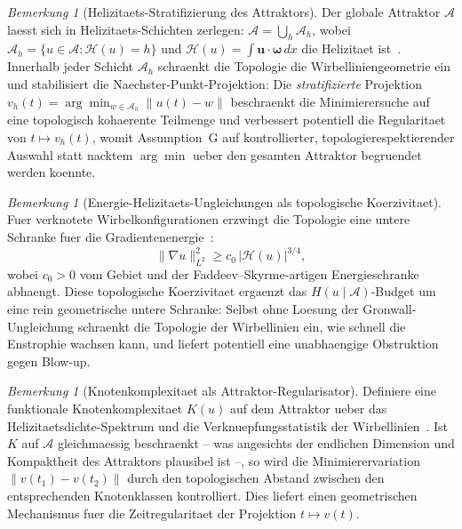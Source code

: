 \documentclass[12pt,a4paper]{article}
\theoremstyle{definition}
\theoremstyle{plain}
\theoremstyle{remark}
\newtheorem{remark}[definition]{Bemerkung}
\begin{document}
\begin{remark}[Helizitaets-Stratifizierung des Attraktors]
\label{rem:helicity-stratification}
Der globale Attraktor $\mathcal{A}$ laesst sich in
Helizitaets-Schichten zerlegen:
$\mathcal{A} = \bigcup_h \mathcal{A}_h$, wobei
$\mathcal{A}_h = \{ u \in \mathcal{A} : \mathcal{H}(u) = h \}$ und
$\mathcal{H}(u) = \int \mathbf{u} \cdot \boldsymbol{\omega}\, dx$
die Helizitaet ist~\cite{Moffatt69, ArnoldKhesin98}. Innerhalb jeder
Schicht $\mathcal{A}_h$ schraenkt die Topologie die
Wirbelliniengeometrie ein und stabilisiert die
Naechster-Punkt-Projektion: Die \emph{stratifizierte} Projektion
$v_h(t) = \arg\min_{w \in \mathcal{A}_h} \|u(t) - w\|$ beschraenkt
die Minimierersuche auf eine topologisch kohaerente Teilmenge und
verbessert potentiell die Regularitaet von $t \mapsto v_h(t)$, womit
Assumption~G auf kontrollierter, topologierespektierender Auswahl
statt nacktem $\arg\min$ ueber den gesamten Attraktor begruendet
werden koennte.
\end{remark}

\begin{remark}[Energie-Helizitaets-Ungleichungen als topologische
Koerzivitaet]
\label{rem:helicity-energy-bounds}
Fuer verknotete Wirbelkonfigurationen erzwingt die Topologie eine
untere Schranke fuer die Gradientenenergie~\cite{ArnoldKhesin98}:
\[
  \|\nabla u\|_{L^2}^2 \geq c_0 \, |\mathcal{H}(u)|^{3/4},
\]
wobei $c_0 > 0$ vom Gebiet und der Faddeev--Skyrme-artigen
Energieschranke abhaengt. Diese topologische Koerzivitaet ergaenzt
das $H(u \mid \mathcal{A})$-Budget um eine rein geometrische untere
Schranke: Selbst ohne Loesung der Gronwall-Ungleichung schraenkt die
Topologie der Wirbellinien ein, wie schnell die Enstrophie wachsen
kann, und liefert potentiell eine unabhaengige Obstruktion gegen
Blow-up.
\end{remark}

\begin{remark}[Knotenkomplexitaet als Attraktor-Regularisator]
\label{rem:knot-complexity}
Definiere eine funktionale Knotenkomplexitaet $K(u)$ auf dem Attraktor
ueber das Helizitaetsdichte-Spektrum und die Verknuepfungsstatistik
der Wirbellinien~\cite{Moffatt69}. Ist $K$ auf $\mathcal{A}$
gleichmaessig beschraenkt -- was angesichts der endlichen Dimension
und Kompaktheit des Attraktors plausibel ist --, so wird die
Minimierervariation $\|v(t_1) - v(t_2)\|$ durch den topologischen
Abstand zwischen den entsprechenden Knotenklassen kontrolliert. Dies
liefert einen geometrischen Mechanismus fuer die Zeitregularitaet der
Projektion $t \mapsto v(t)$.
\end{remark}
\end{document}
